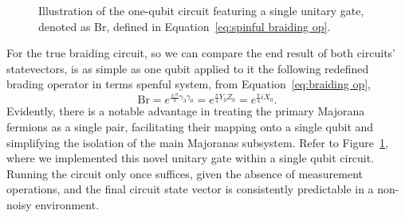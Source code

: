\documentclass{article}
\begin{document}
\begin{figure}
	\begin{center}
		
	\end{center}
	\caption{Illustration of the one-qubit circuit featuring a single unitary gate, denoted as Br, defined in Equation~\ref{eq:spinful braiding op}.}\label{fig:br circuit}
\end{figure}
For the true braiding circuit, so we can compare the end result of both circuits' statevectors, is as simple as one qubit applied to it the following redefined brading operator in terms spenful system, from Equation~\ref{eq:braiding op},
\begin{equation}
	\text{Br} = e^{\frac{\pm \pi}{4} \gamma_3 \gamma_0} = e^{\frac{\pi}{4} Y_0 Z_0} = e^{\frac{\pi}{4} i X_0}.
	\label{eq:spinful braiding op}
\end{equation}
Evidently, there is a notable advantage in treating the primary Majorana fermions as a single pair, facilitating their mapping onto a single qubit and simplifying the isolation of the main Majoranas subsystem. Refer to Figure~\ref{fig:br circuit}, where we implemented this novel unitary gate within a single qubit circuit. Running the circuit only once suffices, given the absence of measurement operations, and the final circuit state vector is consistently predictable in a non-noisy environment.
\end{document}
